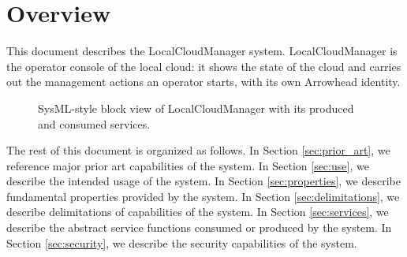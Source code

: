 \documentclass[a4paper]{arrowhead}
\begin{document}
\section{Overview}
\label{sec:overview}

This document describes the LocalCloudManager system. LocalCloudManager is the operator console of the local cloud: it shows the state of the cloud and carries out the management actions an operator starts, with its own Arrowhead identity.

\begin{figure}[ht!]
  \centering
  \caption{SysML-style block view of LocalCloudManager with its produced and consumed services.}
  \label{fig:system}
\end{figure}

The rest of this document is organized as follows.
In Section \ref{sec:prior_art}, we reference major prior art capabilities of the system.
In Section \ref{sec:use}, we describe the intended usage of the system.
In Section \ref{sec:properties}, we describe fundamental properties provided by the system.
In Section \ref{sec:delimitations}, we describe delimitations of capabilities of the system.
In Section \ref{sec:services}, we describe the abstract service functions consumed or produced by the system.
In Section \ref{sec:security}, we describe the security capabilities of the system.
\end{document}

